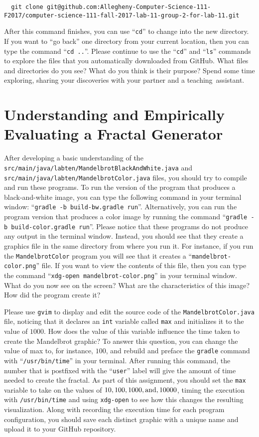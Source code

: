 \documentclass[11pt]{article}
\newcommand{\mainprogramsource}{\lstinline{src/main/java/labten/MandelbrotBlackAndWhite.java}}
\newcommand{\secondprogram}{\lstinline{MandelbrotColor}}
\newcommand{\secondprogramsource}{\lstinline{src/main/java/labten/MandelbrotColor.java}}
\newcommand{\command}[1]{``\lstinline{#1}''}
\newcommand{\program}[1]{\lstinline{#1}}
\newcommand{\step}[1]{``{#1}''}
\begin{document}
\begin{lstlisting}
  git clone git@github.com:Allegheny-Computer-Science-111-F2017/computer-science-111-fall-2017-lab-11-group-2-for-lab-11.git
\end{lstlisting}

After this command finishes, you can use \command{cd} to change into the new directory. If you want to \step{go back}
one directory from your current location, then you can type the command \command{cd ..}. Please continue to use the
\command{cd} and \command{ls} commands to explore the files that you automatically downloaded from GitHub. What files
and directories do you see? What do you think is their purpose? Spend some time exploring, sharing your discoveries with
your partner and a \mbox{teaching assistant}.

\section*{Understanding and Empirically Evaluating a Fractal Generator}

After developing a basic understanding of the \mainprogramsource{} and \secondprogramsource{} files, you should try to
compile and run these programs. To run the version of the program that produces a black-and-white image, you can type
the following command in your terminal window: \command{gradle -b build-bw.gradle run}. Alternatively, you can run the
program version that produces a color image by running the command \command{gradle -b build-color.gradle run}. Please
notice that these programs do not produce any output in the terminal window. Instead, you should see that they create a
graphics file in the same directory from where you run it. For instance, if you run the \secondprogram{} program you
will see that it creates a \command{mandelbrot-color.png} file. If you want to view the contents of this file, then you
can type the command \command{xdg-open mandelbrot-color.png} in your terminal window. What do you now see on the screen?
What are the characteristics of this image? How did the program create it?

Please use {\tt gvim} to display and edit the source code of the {\tt MandelbrotColor.java} file, noticing that it
declares an {\tt int} variable called {\tt max} and initializes it to the value of $1000$. How does the value of this
variable influence the time taken to create the Mandelbrot graphic? To answer this question, you can change the value of
max to, for instance, $100$, and rebuild and preface the \program{gradle} command with ``{\tt /usr/bin/time}'' in your
terminal. After running this command, the number that is postfixed with the ``{\tt user}'' label will give the amount of
time needed to create the fractal. As part of this assignment, you should set the {\tt max} variable to take on the
values of $10, 100, 1000, \mbox{and}, \- 10000$, timing the execution with {\tt /usr/bin/time} and using {\tt xdg-open}
to see how this changes the resulting visualization. Along with recording the execution time for each program
configuration, you should save each distinct graphic with a unique name and upload it to your GitHub repository.
\end{document}
